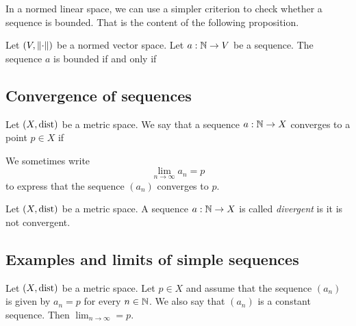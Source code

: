In a normed linear space, we can use a simpler criterion to check whether a sequence is bounded. That is the content of the
following proposition.

\begin{proposition}
    Let $(V, \norm{\cdot})$ be a normed vector space. Let $a: \mathbb{N} \to V$ be a sequence. The sequence $a$ is bounded
    if and only if
    \begin{myCenter}
    \end{myCenter}
\end{proposition}

\subsection{Convergence of sequences}
\begin{definition}
    Let $(X, \text{dist})$ be a metric space. We say that a sequence $a: \mathbb{N} \to X$ converges to a point $p \in X$ if
    \begin{myCenter}
    \end{myCenter}
\end{definition}

We sometimes write
$$\lim_{n\to\infty}a_n = p$$
to express that the sequence $(a_n)$ converges to $p$.

\begin{definition}
    Let $(X, \text{dist})$ be a metric space. A sequence $a: \mathbb{N} \to X$ is called \emph{divergent} is it is not convergent.
\end{definition}

\subsection{Examples and limits of simple sequences}
\begin{proposition}
    Let $(X, \text{dist})$ be a metric space. Let $p \in X$ and assume that the sequence $(a_n)$ is given by $a_n = p$ for every
    $n \in \mathbb{N}$. We also say that $(a_n)$ is a constant sequence. Then $\lim_{n\to\infty} = p$.
\end{proposition}

